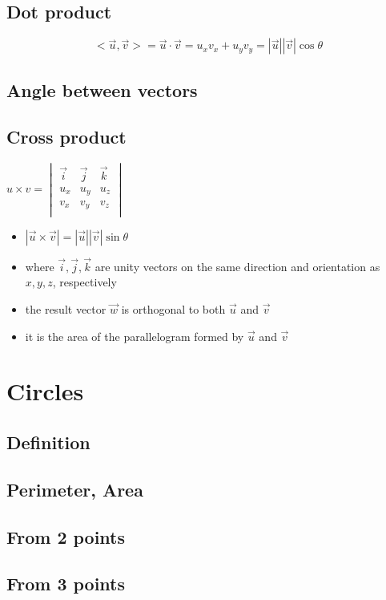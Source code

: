 \subsection{Dot product}
\[
    <\vec{u}, \vec{v}> = \vec{u} \cdot \vec{v} = u_xv_x + u_yv_y = |\vec{u}||\vec{v}|\cos \theta
\]


\subsection{Angle between vectors}

\subsection{Cross product}

$
            u\times v = \begin{vmatrix}
                \vec{i} & \vec{j} & \vec{k} \\
                u_x & u_y & u_z \\
                v_x & v_y & v_z \\
            \end{vmatrix}
$
\begin{itemize}
\item $|\vec{u}\times \vec{v}| = |\vec{u}||\vec{v}|\sin \theta$
\item where $\vec{i}, \vec{j}, \vec{k}$ are unity vectors on the same direction and orientation as $x, y, z$, respectively
\item the result vector $\vec{w}$ is orthogonal to both $\vec{u}$ and $\vec{v}$
\item it is the area of the parallelogram formed by $\vec{u}$ and $\vec{v}$
\end{itemize}


\section{Circles}

\subsection{Definition}

\subsection{Perimeter, Area}

\subsection{From 2 points}

\subsection{From 3 points}

\clearpage
